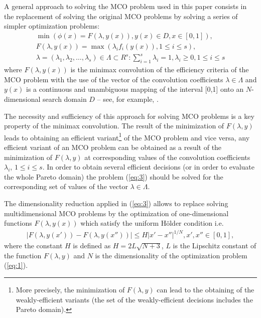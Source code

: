 A general approach to solving the MCO problem used in this paper consists in the replacement of solving the original MCO problems by solving a series of simpler optimization problems: 
\begin{equation}\label{eq:3}
\begin{split}
\min{(\phi(x) = F(\lambda, y(x)), y(x) \in D, x \in [0,1])},\\
F(\lambda,y(x))=\max⁡{(\lambda_i f_i(y(x)), 1 \leq i \leq s)},\\
\lambda=(\lambda_1,\lambda_2,\dots,\lambda_s) \in \Lambda \subset R^s : \sum_{i=1}^s{\lambda_i}=1, \lambda_i \geq 0, 1 \leq i \leq s
\end{split}
\end{equation}
where $F(\lambda,y(x))$ is the minimax convolution of the efficiency criteria of the MCO problem \cite{c2,c6,c19} with the use of the vector of the convolution coefficients $\lambda \in \Lambda$ and $y(x)$ is a continuous and unambiguous mapping of the interval [0,1] onto an $N$-dimensional search domain $D$ -- see, for example, \cite{c7,c8}.

The necessity and sufficiency of this approach for solving MCO problems is a key property of the minimax convolution. The result of the minimization of $F(\lambda,y)$ leads to obtaining an efficient variant\footnote{More precisely, the minimization of $F(\lambda,y)$ can lead to the obtaining of the weakly-efficient variants (the set of the weakly-efficient decisions includes the Pareto domain).} of the MCO problem and vice versa, any efficient variant of an MCO problem can be obtained as a result of the minimization of $F(\lambda,y)$ at corresponding values of the convolution coefficients $\lambda_i$, $1 \leq i \leq s$. In order to obtain several efficient decisions (or in order to evaluate the whole Pareto domain) the problem (\ref{eq:3}) should be solved for the corresponding set of values of the vector $\lambda \in \Lambda$.

The dimensionality reduction applied in (\ref{eq:3}) allows to replace solving multidimensional MCO problems by the optimization of one-dimensional functions $F(\lambda,y(x))$ which satisfy the uniform H\"{o}lder condition i.e.
\begin{eqnarray} \label{eq:04}
|F(\lambda, y(x')) - F(\lambda, y(x''))| \leq H |x' - x''|^{1/N}, x', x'' \in [0,1], 
\end{eqnarray}
where the constant $H$ is defined as $H=2L\sqrt{N+3}$, $L$ is the Lipschitz constant of the function $F(\lambda,y)$ and $N$ is the dimensionality of the optimization problem (\ref{eq:1}).


